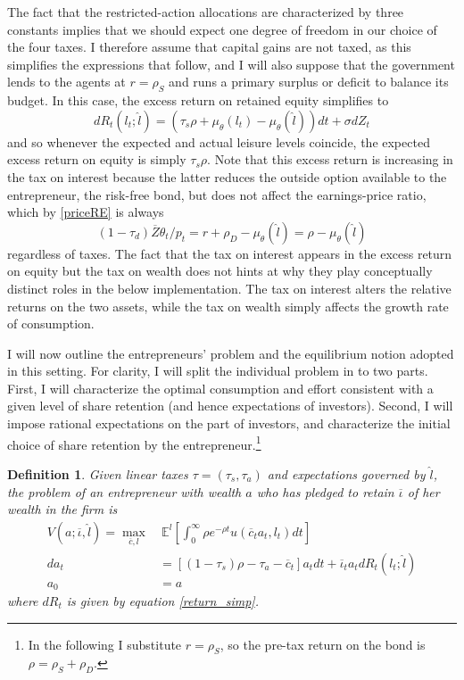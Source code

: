 \documentclass[11pt]{article}
\theoremstyle{plain}
\newtheorem{defn}{Definition}[section]
\begin{document}
The fact that the restricted-action allocations are characterized by three constants implies that we should expect one degree of freedom in our choice of the four taxes. I therefore assume that capital gains are not taxed, as this simplifies the expressions that follow, and I will also suppose that the government lends to the agents at $r = \rho_S$ and runs a primary surplus or deficit to balance its budget. In this case, the excess return on retained equity simplifies to
\begin{equation}
dR_t(l_t;\hat{l}) = (\tau_s \rho + \mu_{\theta}(l_t) - \mu_{\theta}(\hat{l}))dt + \sigma dZ_t
\label{return_simp}
\end{equation}
and so whenever the expected and actual leisure levels coincide, the expected excess return on equity is simply $\tau_s \rho$. Note that this excess return is increasing in the tax on interest because the latter reduces the outside option available to the entrepreneur, the risk-free bond, but does not affect the earnings-price ratio, which by \eqref{priceRE} is always 
$$ %
(1-\tau_d)\overline{Z}\theta_t/p_t = r + \rho_D - \mu_{\theta}(\hat{l}) = \rho - \mu_{\theta}(\hat{l})
$$
regardless of taxes. The fact that the tax on interest appears in the excess return on equity but the tax on wealth does not hints at why they play conceptually distinct roles in the below implementation. The tax on interest alters the relative returns on the two assets, while the tax on wealth simply affects the growth rate of consumption. 


I will now outline the entrepreneurs' problem and the equilibrium notion adopted in this setting. For clarity, I will split the individual problem in to two parts. First, I will characterize the optimal consumption and effort consistent with a given level of share retention (and hence expectations of investors). Second, I will impose rational expectations on the part of investors, and characterize the initial choice of share retention by the entrepreneur.\footnote{In the following I substitute $r = \rho_S$, so the pre-tax return on the bond is $\rho = \rho_S + \rho_D$.}

\begin{defn}  \label{conPROBlin2}
Given linear taxes $\tau = (\tau_s,\tau_a)$ and expectations governed by $\hat{l}$, the problem of an entrepreneur with wealth $a$ who has pledged to retain $\overline{\iota}$ of her wealth in the firm is
\begin{align*}
V(a; \overline{\iota}, \hat{l}) = \max_{\overline{c},l} & \ \mathbb{E}^l{\left[\int_{0}^{\infty}\rho e^{-\rho t}u(\overline{c}_ta_t,l_t)dt\right]}
\\ da_t & = [(1-\tau_s)\rho - \tau_a - \overline{c}_t]a_tdt + \overline{\iota}_t a_tdR_t(l_t;\hat{l})
\\ a_0 & = a
\end{align*}
where $dR_t$ is given by equation \eqref{return_simp}. 
\end{defn}
\end{document}
